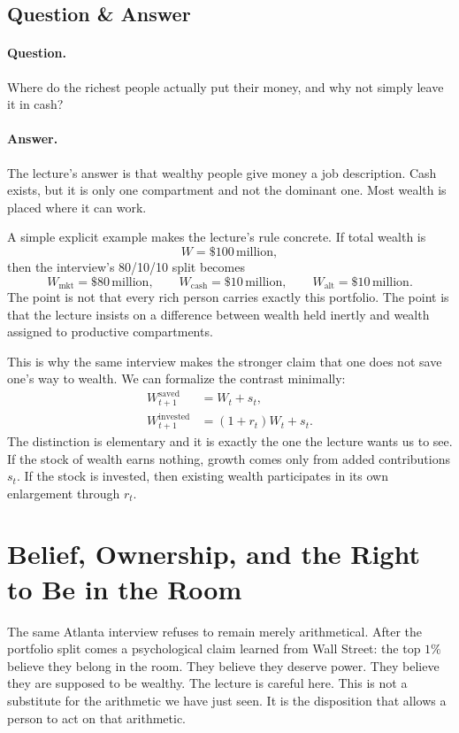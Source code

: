 \subsection{Question \& Answer}

\paragraph{Question.} Where do the richest people actually put their money, and why not simply leave it in cash?

\paragraph{Answer.} The lecture's answer is that wealthy people give money a job description. Cash exists, but it is only one compartment and not the dominant one. Most wealth is placed where it can work.

A simple explicit example makes the lecture's rule concrete. If total wealth is
\[
W=\$100\,\text{million},
\]
then the interview's 80/10/10 split becomes
\[
W_{\mathrm{mkt}}=\$80\,\text{million},\qquad
W_{\mathrm{cash}}=\$10\,\text{million},\qquad
W_{\mathrm{alt}}=\$10\,\text{million}.
\]
The point is not that every rich person carries exactly this portfolio. The point is that the lecture insists on a difference between wealth held inertly and wealth assigned to productive compartments.

This is why the same interview makes the stronger claim that one does not save one's way to wealth. We can formalize the contrast minimally:
\begin{align}
W_{t+1}^{\mathrm{saved}} &= W_t + s_t, \\
W_{t+1}^{\mathrm{invested}} &= (1+r_t)W_t + s_t.
\end{align}
The distinction is elementary and it is exactly the one the lecture wants us to see. If the stock of wealth earns nothing, growth comes only from added contributions \(s_t\). If the stock is invested, then existing wealth participates in its own enlargement through \(r_t\).

\section{Belief, Ownership, and the Right to Be in the Room}

The same Atlanta interview refuses to remain merely arithmetical. After the portfolio split comes a psychological claim learned from Wall Street: the top \(1\%\) believe they belong in the room. They believe they deserve power. They believe they are supposed to be wealthy. The lecture is careful here. This is not a substitute for the arithmetic we have just seen. It is the disposition that allows a person to act on that arithmetic.

